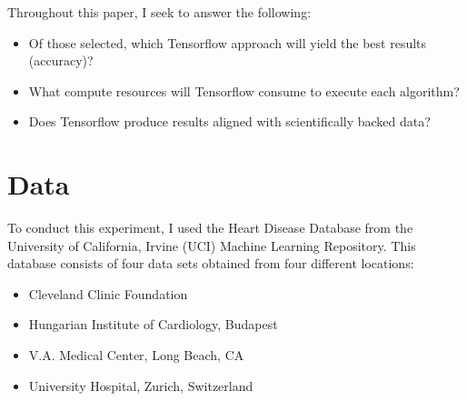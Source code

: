 \documentclass[conference]{IEEEtran}
\begin{document}
Throughout this paper, I seek to answer the following:
\begin{itemize}
    \item Of those selected, which Tensorflow approach will yield the best results (accuracy)?
    \item What compute resources will Tensorflow consume to execute each algorithm?
    \item Does Tensorflow produce results aligned with scientifically backed data?
\end{itemize}

\section{Data}
To conduct this experiment, I used the Heart Disease Database from the University of California, Irvine (UCI) Machine Learning Repository\cite{b8}. This database consists of four data sets obtained from four different locations:

\begin{itemize}
    \item Cleveland Clinic Foundation 
    \item Hungarian Institute of Cardiology, Budapest
    \item V.A. Medical Center, Long Beach, CA 
    \item University Hospital, Zurich, Switzerland 
\end{itemize}
\end{document}
